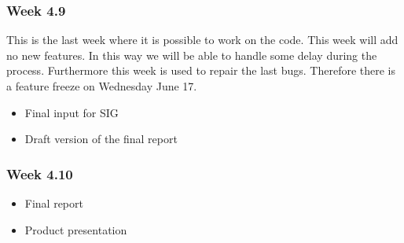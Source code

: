 \subsubsection{Week 4.9}
	This is the last week where it is possible to work on the code. This week will add no new features. In this way we will be able to handle some delay during the process. Furthermore this week is used to repair the last bugs. Therefore there is a feature freeze on Wednesday June 17. 
\begin{itemize}
	\item Final input for SIG
	\item Draft version of the final report
\end{itemize}
\subsubsection{Week 4.10}
\begin{itemize}
	\item Final report
	\item Product presentation
\end{itemize}